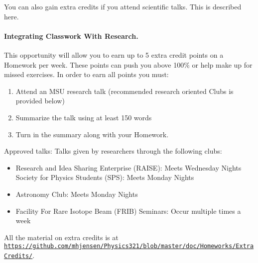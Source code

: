 \documentclass[%
oneside,                 %
final,                   %
10pt]{article}
\begin{document}
\noindent
You can also gain extra credits if you attend scientific talks.
This is described here.

\paragraph{Integrating Classwork With Research.}
This opportunity will allow you to earn up to 5 extra credit points on a Homework per week. These points can push you above 100\% or help make up for missed exercises.
In order to earn all points you must:

\begin{enumerate}
\item Attend an MSU research talk (recommended research oriented Clubs is  provided below)

\item Summarize the talk using at least 150 words

\item Turn in the summary along with your Homework.
\end{enumerate}

\noindent
Approved talks:
Talks given by researchers through the following clubs:
\begin{itemize}
\item Research and Idea Sharing Enterprise (RAISE)​: Meets Wednesday Nights Society for Physics Students (SPS)​: Meets Monday Nights

\item Astronomy Club​: Meets Monday Nights

\item Facility For Rare Isotope Beam (FRIB) Seminars: ​Occur multiple times a week
\end{itemize}

\noindent
All the material on extra credits is at \href{{https://github.com/mhjensen/Physics321/blob/master/doc/Homeworks/ExtraCredits/}}{\nolinkurl{https://github.com/mhjensen/Physics321/blob/master/doc/Homeworks/ExtraCredits/}}. 


\end{document}
